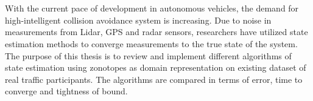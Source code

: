 \chapter{\abstractname}
With the current pace of development in autonomous vehicles, the demand for high-intelligent collision avoidance system is increasing. Due to noise in measurements from Lidar, GPS and radar sensors, researchers have utilized state estimation methods to converge measurements to the true state of the system. The purpose of this thesis is to review and implement different algorithms of state estimation using zonotopes as domain representation on existing dataset of real traffic participants. The algorithms are compared in terms of error, time to converge and tightness of bound.